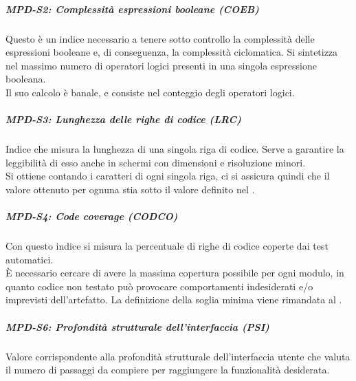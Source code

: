 \subparagraph{MPD-S2: Complessità espressioni booleane (COEB)}
Questo è un indice necessario a tenere sotto controllo la complessità delle espressioni booleane e, di conseguenza, la complessità ciclomatica.
Si sintetizza nel massimo numero di operatori logici presenti in una singola espressione booleana.\\
Il suo calcolo è banale, e consiste nel conteggio degli operatori logici.

\subparagraph{MPD-S3: Lunghezza delle righe di codice (LRC)}
Indice che misura la lunghezza di una singola riga di codice. Serve a garantire la leggibilità di esso anche in schermi
con dimensioni e risoluzione minori.\\
Si ottiene contando i caratteri di ogni singola riga, ci si assicura quindi che il valore ottenuto per ognuna stia sotto il valore
definito nel .

\subparagraph{MPD-S4: Code coverage (CODCO)}
Con questo indice si misura la percentuale di righe di codice coperte dai test automatici.\\
È necessario cercare di avere la massima copertura possibile per ogni modulo, in quanto codice non testato
può provocare comportamenti indesiderati e/o imprevisti dell'artefatto. La definizione della soglia minima viene rimandata al .

\subparagraph{MPD-S6: Profondità strutturale dell'interfaccia (PSI)}
Valore corrispondente alla profondità strutturale dell'interfaccia utente che valuta il numero di passaggi da compiere per raggiungere la funzionalità desiderata.
